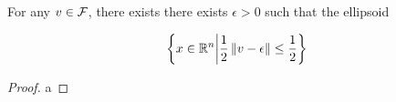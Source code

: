 %             
%             
%             




\begin{lemma}
For any $v \in {\mathcal F}$, there exists there exists $\epsilon > 0$ such that the ellipsoid

\begin{align*}
\left\{x \in \mathbb R^n \bigg | \frac 1 2 \left\| v - \epsilon \right\| \le \frac 1 2 \right\}
\end{align*}

\end{lemma}

\begin{proof}
a
\end{proof}
